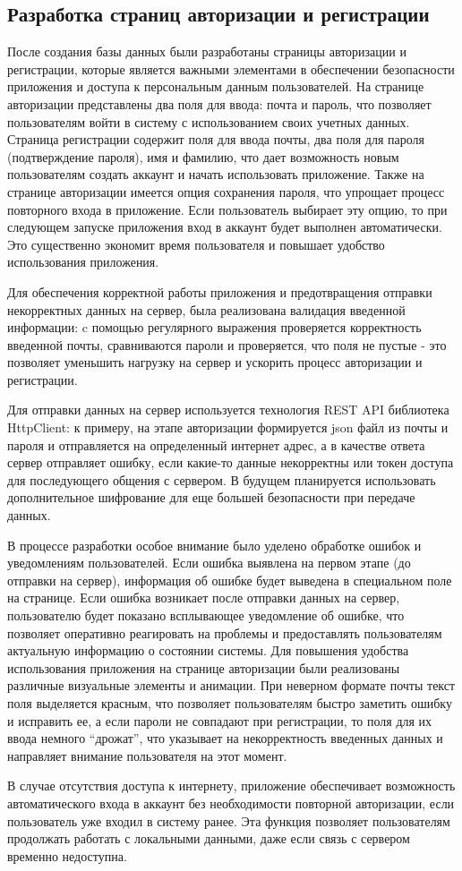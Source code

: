\subsection{Разработка страниц авторизации и регистрации}
После создания базы данных были разработаны страницы авторизации и регистрации, которые является важными элементами в обеспечении безопасности приложения и доступа к персональным данным пользователей. На странице авторизации представлены два поля для ввода: почта и пароль, что позволяет пользователям войти в систему с использованием своих учетных данных. Страница регистрации содержит поля для ввода почты, два поля для пароля (подтверждение пароля), имя и фамилию, что дает возможность новым пользователям создать аккаунт и начать использовать приложение. Также на странице авторизации имеется опция сохранения пароля, что упрощает процесс повторного входа в приложение. Если пользователь выбирает эту опцию, то при следующем запуске приложения вход в аккаунт будет выполнен автоматически. Это существенно экономит время пользователя и повышает удобство использования приложения.

Для обеспечения корректной работы приложения и предотвращения отправки некорректных данных на сервер, была реализована валидация введенной информации: c помощью регулярного выражения проверяется корректность введенной почты, сравниваются пароли и проверяется, что поля не пустые - это позволяет уменьшить нагрузку на сервер и ускорить процесс авторизации и регистрации.

Для отправки данных на сервер используется технология REST API библиотека HttpClient: к примеру, на этапе авторизации формируется json файл из почты и пароля и отправляется на определенный интернет адрес, а в качестве ответа сервер отправляет ошибку, если какие-то данные некорректны или токен доступа для последующего общения с сервером. В будущем планируется использовать дополнительное шифрование для еще большей безопасности при передаче данных.

В процессе разработки особое внимание было уделено обработке ошибок и уведомлениям пользователей. Если ошибка выявлена на первом этапе (до отправки на сервер), информация об ошибке будет выведена в специальном поле на странице. Если ошибка возникает после отправки данных на сервер, пользователю будет показано всплывающее уведомление об ошибке, что позволяет оперативно реагировать на проблемы и предоставлять пользователям актуальную информацию о состоянии системы. Для повышения удобства использования приложения на странице авторизации были реализованы различные визуальные элементы и анимации. При неверном формате почты текст поля выделяется красным, что позволяет пользователям быстро заметить ошибку и исправить ее, а если пароли не совпадают при регистрации, то поля для их ввода немного \enquote{дрожат}, что указывает на некорректность введенных данных и направляет внимание пользователя на этот момент.

В случае отсутствия доступа к интернету, приложение обеспечивает возможность автоматического входа в аккаунт без необходимости повторной авторизации, если пользователь уже входил в систему ранее. Эта функция позволяет пользователям продолжать работать с локальными данными, даже если связь с сервером временно недоступна.